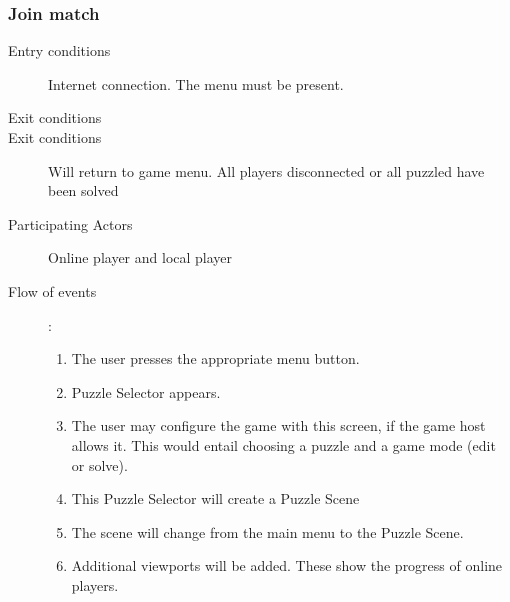\documentclass[12pt]{article}
\begin{document}
    \subsubsection{Join match}
    \begin{description}
        \item[Entry conditions] Internet connection. The menu must be present.
        \item[Exit conditions]
        \item[Exit conditions] Will return to game menu. All players
            disconnected or all puzzled have been solved
        \item[Participating Actors] Online player and local player
        \item[Flow of events]:
            \begin{enumerate}
                \item The user presses the appropriate menu button.
                \item Puzzle Selector appears.
                \item The user may configure the game with this screen, if
                    the game host allows it. This would
                    entail choosing a puzzle and a game mode (edit or solve).
                \item This Puzzle Selector will create a Puzzle Scene
                \item The scene will change from the main menu to the Puzzle
                    Scene.
                \item Additional viewports will be added. These show the
                    progress of online players.
            \end{enumerate}
    \end{description}


\end{document}
